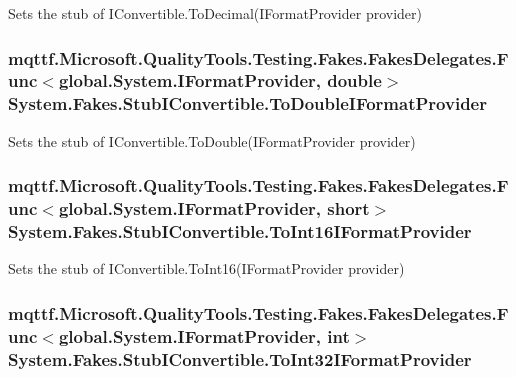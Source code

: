 Sets the stub of I\-Convertible.\-To\-Decimal(\-I\-Format\-Provider provider)

\hypertarget{class_system_1_1_fakes_1_1_stub_i_convertible_a3cb2d8eab3d62022832c0c15a4e43591}{
\subsubsection[{To\-Double\-I\-Format\-Provider}]{\setlength{\rightskip}{0pt plus 5cm}mqttf.\-Microsoft.\-Quality\-Tools.\-Testing.\-Fakes.\-Fakes\-Delegates.\-Func$<$global.\-System.\-I\-Format\-Provider, double$>$ System.\-Fakes.\-Stub\-I\-Convertible.\-To\-Double\-I\-Format\-Provider}}\label{class_system_1_1_fakes_1_1_stub_i_convertible_a3cb2d8eab3d62022832c0c15a4e43591}


Sets the stub of I\-Convertible.\-To\-Double(\-I\-Format\-Provider provider)

\hypertarget{class_system_1_1_fakes_1_1_stub_i_convertible_adfe9961a04396d7557876a3de96fbbed}{
\subsubsection[{To\-Int16\-I\-Format\-Provider}]{\setlength{\rightskip}{0pt plus 5cm}mqttf.\-Microsoft.\-Quality\-Tools.\-Testing.\-Fakes.\-Fakes\-Delegates.\-Func$<$global.\-System.\-I\-Format\-Provider, short$>$ System.\-Fakes.\-Stub\-I\-Convertible.\-To\-Int16\-I\-Format\-Provider}}\label{class_system_1_1_fakes_1_1_stub_i_convertible_adfe9961a04396d7557876a3de96fbbed}


Sets the stub of I\-Convertible.\-To\-Int16(\-I\-Format\-Provider provider)

\hypertarget{class_system_1_1_fakes_1_1_stub_i_convertible_aaac0a4a63883abd90b2ee054120bc7e6}{
\subsubsection[{To\-Int32\-I\-Format\-Provider}]{\setlength{\rightskip}{0pt plus 5cm}mqttf.\-Microsoft.\-Quality\-Tools.\-Testing.\-Fakes.\-Fakes\-Delegates.\-Func$<$global.\-System.\-I\-Format\-Provider, int$>$ System.\-Fakes.\-Stub\-I\-Convertible.\-To\-Int32\-I\-Format\-Provider}}\label{class_system_1_1_fakes_1_1_stub_i_convertible_aaac0a4a63883abd90b2ee054120bc7e6}


